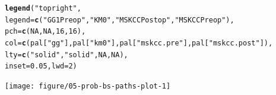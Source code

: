 \documentclass{article}\usepackage[]{graphicx}\usepackage[]{color}
\makeatletter
\newcommand{\hlnum}[1]{\textcolor[rgb]{0.686,0.059,0.569}{#1}}%
\newcommand{\hlstr}[1]{\textcolor[rgb]{0.192,0.494,0.8}{#1}}%
\newcommand{\hlstd}[1]{\textcolor[rgb]{0.345,0.345,0.345}{#1}}%
\newcommand{\hlkwc}[1]{\textcolor[rgb]{0.333,0.667,0.333}{#1}}%
\newcommand{\hlkwd}[1]{\textcolor[rgb]{0.737,0.353,0.396}{\textbf{#1}}}%
\newenvironment{kframe}{%
 \def\at@end@of@kframe{}%
 \ifinner\ifhmode%
  \def\at@end@of@kframe{\end{minipage}}%
  \begin{minipage}{\columnwidth}%
 \fi\fi%
 \def\FrameCommand##1{\hskip\@totalleftmargin \hskip-\fboxsep
 \colorbox{shadecolor}{##1}\hskip-\fboxsep
     \hskip-\linewidth \hskip-\@totalleftmargin \hskip\columnwidth}%
 \MakeFramed {\advance\hsize-\width
   \@totalleftmargin\z@ \linewidth\hsize
   \@setminipage}}%
 {\par\unskip\endMakeFramed%
 \at@end@of@kframe}
\newenvironment{knitrout}{}{} %
\makeatother
\begin{document}
\begin{knitrout}
\begin{kframe}
\begin{alltt}
\hlkwd{legend}\hlstd{(}\hlstr{"topright"}\hlstd{,}
        \hlkwc{legend} \hlstd{=} \hlkwd{c}\hlstd{(}     \hlstr{"GG1 Preop"}\hlstd{,}    \hlstr{"KM0"}\hlstd{,}          \hlstr{"MSKCC Postop"}\hlstd{,}         \hlstr{"MSKCC Preop"}\hlstd{),}
        \hlkwc{pch} \hlstd{=} \hlkwd{c}\hlstd{(}        \hlnum{NA}\hlstd{,}                     \hlnum{NA}\hlstd{,}             \hlnum{16}\hlstd{,}                             \hlnum{16}\hlstd{),}
        \hlkwc{col} \hlstd{=} \hlkwd{c}\hlstd{(        pal[}\hlstr{"gg"}\hlstd{],              pal[}\hlstr{"km0"}\hlstd{], pal[}\hlstr{"mskcc.pre"}\hlstd{],   pal[}\hlstr{"mskcc.post"}\hlstd{]),}
        \hlkwc{lty} \hlstd{=} \hlkwd{c}\hlstd{(}        \hlstr{"solid"}\hlstd{,}                \hlstr{"solid"}\hlstd{,}        \hlnum{NA}\hlstd{,}                             \hlnum{NA}\hlstd{),}
        \hlkwc{inset} \hlstd{=} \hlnum{0.05}\hlstd{,} \hlkwc{lwd} \hlstd{=} \hlnum{2}\hlstd{)}
\end{alltt}
\end{kframe}

{\centering \texttt{[image: figure/05-prob-bs-paths-plot-1]} 

}



\end{knitrout}
\end{document}
